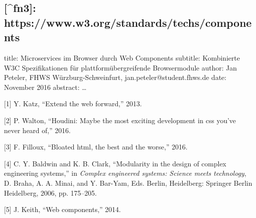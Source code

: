 \subsection{{[}\^{}fn3{]}:
https://www.w3.org/standards/techs/components}\label{fn3-httpswww.w3.orgstandardstechscomponents}

title: Microservices im Browser durch Web Components subtitle:
Kombinierte W3C Spezifikationen für plattformübergreifende Browsermodule
author: Jan Peteler, FHWS Würzburg-Schweinfurt,
jan.peteler@student.fhws.de date: November 2016 abstract: \ldots{}

\hypertarget{refs}{}
\hypertarget{ref-Katz2013}{}
{[}1{]} Y. Katz, ``Extend the web forward,'' 2013.

\hypertarget{ref-Walton2016}{}
{[}2{]} P. Walton, ``Houdini: Maybe the most exciting development in css
you've never heard of,'' 2016.

\hypertarget{ref-Filloux2016}{}
{[}3{]} F. Filloux, ``Bloated html, the best and the worse,'' 2016.

\hypertarget{ref-Baldwin2006}{}
{[}4{]} C. Y. Baldwin and K. B. Clark, ``Modularity in the design of
complex engineering systems,'' in \emph{Complex engineered systems:
Science meets technology}, D. Braha, A. A. Minai, and Y. Bar-Yam, Eds.
Berlin, Heidelberg: Springer Berlin Heidelberg, 2006, pp. 175--205.

\hypertarget{ref-Keith2014}{}
{[}5{]} J. Keith, ``Web components,'' 2014.

